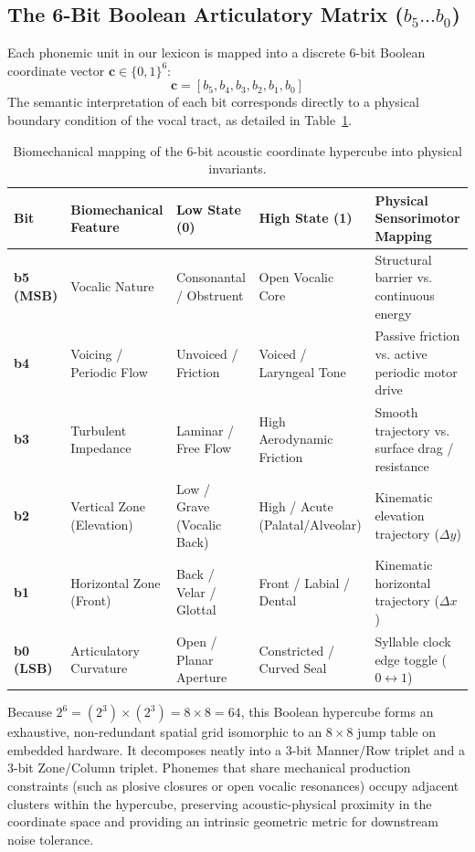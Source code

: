 \documentclass[journal,twocolumn]{IEEEtran}
\begin{document}
\subsection{The 6-Bit Boolean Articulatory Matrix ($b_5 \dots b_0$)}
Each phonemic unit in our lexicon is mapped into a discrete 6-bit Boolean coordinate vector $\mathbf{c} \in \{0, 1\}^6$:
\begin{equation}
\mathbf{c} = [b_5, b_4, b_3, b_2, b_1, b_0]
\end{equation}
The semantic interpretation of each bit corresponds directly to a physical boundary condition of the vocal tract, as detailed in Table~\ref{tab:matrix}.

\begin{table}[t]
\centering
\caption{Biomechanical mapping of the 6-bit acoustic coordinate hypercube into physical invariants.}
\label{tab:matrix}
\begin{tabular}{lllll}
\toprule
\textbf{Bit} & \textbf{Biomechanical Feature} & \textbf{Low State (0)} & \textbf{High State (1)} & \textbf{Physical Sensorimotor Mapping} \\
\midrule
\textbf{b5 (MSB)} & Vocalic Nature & Consonantal / Obstruent & Open Vocalic Core & Structural barrier vs. continuous energy \\
\textbf{b4} & Voicing / Periodic Flow & Unvoiced / Friction & Voiced / Laryngeal Tone & Passive friction vs. active periodic motor drive \\
\textbf{b3} & Turbulent Impedance & Laminar / Free Flow & High Aerodynamic Friction & Smooth trajectory vs. surface drag / resistance \\
\textbf{b2} & Vertical Zone (Elevation) & Low / Grave (Vocalic Back) & High / Acute (Palatal/Alveolar) & Kinematic elevation trajectory ($\Delta y$) \\
\textbf{b1} & Horizontal Zone (Front) & Back / Velar / Glottal & Front / Labial / Dental & Kinematic horizontal trajectory ($\Delta x$) \\
\textbf{b0 (LSB)} & Articulatory Curvature & Open / Planar Aperture & Constricted / Curved Seal & Syllable clock edge toggle ($0 \leftrightarrow 1$) \\
\bottomrule
\end{tabular}
\end{table}

Because $2^6 = (2^3) \times (2^3) = 8 \times 8 = 64$, this Boolean hypercube forms an exhaustive, non-redundant spatial grid isomorphic to an $8 \times 8$ jump table on embedded hardware. It decomposes neatly into a 3-bit Manner/Row triplet and a 3-bit Zone/Column triplet. Phonemes that share mechanical production constraints (such as plosive closures or open vocalic resonances) occupy adjacent clusters within the hypercube, preserving acoustic-physical proximity in the coordinate space and providing an intrinsic geometric metric for downstream noise tolerance.
\end{document}
